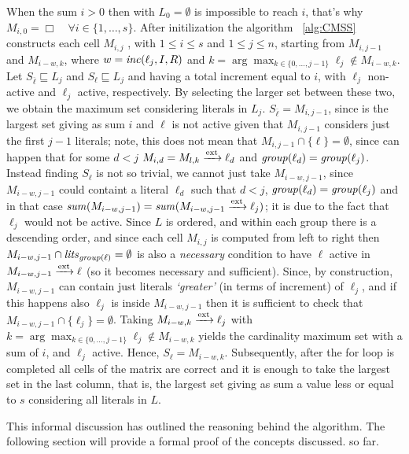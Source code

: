 When the sum $ i > 0$ then with $L_0 = \emptyset$ is impossible to reach $i$, 
that's why $M_{i,0} = \Box \quad \forall i \in \{1, \hdots , s\}$.
After initilization the algorithm ~\ref{alg:CMSS} constructs each cell $M_{i,j}$
, with $ 1 \le i \le s$ and $1 \le j \le n$, starting from $M_{i,j-1}$ and $M_{i-w,k}$,
where $w = \mathit{inc}(\ell_j,I,R)$ and $k = \arg \max_{k \in \{0,\hdots,j-1\}} \ell_j \not\in M_{i-w,k}$.
Let $S_{\overline{\ell}} \sqsubseteq L_j $ and $S_{\ell} \sqsubseteq L_j$ and having 
a total increment equal to $i$, with \(\ell_j\) 
non-active and \(\ell_j\) active, respectively. 
By selecting the larger set between these two, 
we obtain the maximum set considering literals in $L_j$.
$S_{\overline{\ell}} = M_{i,j-1}$, since is the largest set giving as sum $i$
and $\ell$ is not active given that $M_{i,j-1}$ considers just the first $j-1$ literals;
note, this does not mean that $M_{i,j-1} \cap \{\ell\} = \emptyset$, since can happen 
that for some $d < j$ $M_{i,d} = M_{l,k} \xrightarrow{\text{ext}} \ell_d$ and $\mathit{group}(\ell_d) = \mathit{group}(\ell_j)$.
Instead finding $S_{\ell}$ is not so trivial, we cannot just take $M_{i-w,j-1}$,
since $M_{i-w,j-1}$ could containt a literal $\ell_d$ such that $d < j$,
$\mathit{group}(\ell_d) = \mathit{group}(\ell_j)$ and in that case 
$\mathit{sum}(M_{i-w,j-1}) = \mathit{sum}(M_{i-w,j-1} \xrightarrow{\text{ext}} \ell_j)$;
it is due to the fact that $\ell_j$ would not be active.
Since $L$ is ordered, and within each group there is a descending order, and since each 
cell $M_{i,j}$ is computed from left to right
then $M_{i-w,j-1} \cap \mathit{lits}_{\mathit{group}(\ell)} = \emptyset$ is also a \textit{necessary}
condition to have $\ell$
active in $M_{i-w,j-1} \xrightarrow{\text{ext}} \ell$
(so it becomes necessary and sufficient).
Since, by construction, $M_{i-w,j-1}$ can contain just literals \textit{`greater'} (in terms of 
increment) of $\ell_j$, and if this happens also $\ell_j$ is inside $M_{i-w,j-1}$ then 
it is sufficient to check that $M_{i-w,j-1} \cap \{\ell_j\} = \emptyset$.
Taking $M_{i-w,k} \xrightarrow{\text{ext}} \ell_j$ with $k = \arg \max_{k \in \{0,\hdots,j-1\}} \ell_j \not\in M_{i-w,k}$ 
yields the cardinality maximum set with a sum of \( i \), and \(\ell_j\) active.
Hence, $S_{\ell} = M_{i-w,k}$.
Subsequently, after the for loop is completed all cells of the matrix are correct 
and it is enough to take the largest set in the last column, that is, the 
largest set giving as sum a value less or equal to $s$ considering all literals in $L$.

This informal discussion has outlined the reasoning behind the algorithm. 
The following section will provide a formal proof of the concepts discussed.
so far.

